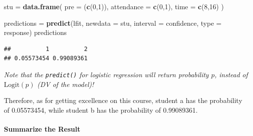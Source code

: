 \documentclass[
]{ctexart}
\newenvironment{Shaded}{\begin{snugshade}}{\end{snugshade}}
\newcommand{\AttributeTok}[1]{\textcolor[rgb]{0.13,0.29,0.53}{#1}}
\newcommand{\DecValTok}[1]{\textcolor[rgb]{0.00,0.00,0.81}{#1}}
\newcommand{\FunctionTok}[1]{\textcolor[rgb]{0.13,0.29,0.53}{\textbf{#1}}}
\newcommand{\NormalTok}[1]{#1}
\newcommand{\OtherTok}[1]{\textcolor[rgb]{0.56,0.35,0.01}{#1}}
\newcommand{\SpecialCharTok}[1]{\textcolor[rgb]{0.81,0.36,0.00}{\textbf{#1}}}
\newcommand{\StringTok}[1]{\textcolor[rgb]{0.31,0.60,0.02}{#1}}
\begin{document}
\begin{Shaded}
\begin{Highlighting}[]
\NormalTok{stu }\OtherTok{=} \FunctionTok{data.frame}\NormalTok{(}
  \AttributeTok{pre =}\NormalTok{ (}\FunctionTok{c}\NormalTok{(}\DecValTok{0}\NormalTok{,}\DecValTok{1}\NormalTok{)),}
  \AttributeTok{attendance =} \FunctionTok{c}\NormalTok{(}\DecValTok{0}\NormalTok{,}\DecValTok{1}\NormalTok{),}
  \AttributeTok{time =} \FunctionTok{c}\NormalTok{(}\DecValTok{8}\NormalTok{,}\DecValTok{16}\NormalTok{)}
\NormalTok{)}

\NormalTok{predictions }\OtherTok{=} \FunctionTok{predict}\NormalTok{(lfit,}
                      \AttributeTok{newdata =}\NormalTok{ stu,}
                      \AttributeTok{interval =} \StringTok{\textquotesingle{}confidence\textquotesingle{}}\NormalTok{, }
                      \AttributeTok{type =} \StringTok{\textquotesingle{}response\textquotesingle{}}\NormalTok{)}
\NormalTok{predictions}
\end{Highlighting}
\end{Shaded}

\begin{verbatim}
##          1          2 
## 0.05573454 0.99089361
\end{verbatim}

\emph{Note that the \texttt{predict()} for logistic regression will
return probability \(p\), instead of \(\text{Logit}(p)\) (DV of the
model)!}

Therefore, as for getting excellence on this course, student a has the
probability of 0.05573454, while student b has the probability of
0.99089361.

\hypertarget{summarize-the-result}{%
\paragraph{Summarize the Result}\label{summarize-the-result}}

\begin{Shaded}
\end{Shaded}
\end{document}
